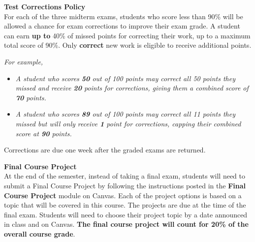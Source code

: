 \documentclass[11pt]{article}
\renewcommand{\emph}[1]{\textsf{\textbf{#1}}}
\newcommand{\localhead}[1]{\par\smallskip\textbf{#1} \smallskip\nobreak\\}%
\def\heading#1{\localhead{\large\emph{#1}}}
\def\subheading#1{\localhead{\emph{#1}}}
\begin{document}

\subheading{Test Corrections Policy}
For each of the three midterm exams, students who score less than 90\% will be allowed a chance for exam corrections to improve their exam grade. A student can earn \emph{up to} 40\% of missed points for correcting their work, up to a maximum total score of 90\%. Only \emph{correct} new work is eligible to receive additional points.


{\it For example,
\begin{itemize}
\item {\it A student who scores {\bf 50} out of 100 points may
correct all 50 points they missed and receive {\bf 20} points for
corrections, giving them a combined score of {\bf 70} points.}
\item {\it A student who scores {\bf 89} out of 100 points may
correct all 11 points they missed but will only receive {\bf 1} point
for corrections, capping their combined score at {\bf 90} points.}
\end{itemize}
}

Corrections are due one week after the graded exams are returned.


\heading{Final Course Project}
At the end of the semester, instead of taking a final exam, students will need to submit a Final
Course Project by following the instructions posted in the \emph{Final Course Project} module on
Canvas. Each of the project options is based on a topic that will be covered in this course.
The projects are due at the time of the final exam. Students will need to choose their project topic by
a date announced in class and on Canvas. {\bf The final course project will count for 20\% of the overall course grade}.
\end{document}
